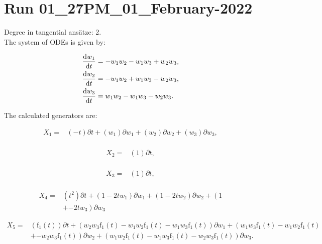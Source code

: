 \section*{Run 01\_27PM\_01\_February-2022}
Degree in tangential ansätze:	2.\\
The system of ODEs is given by:

\begin{align*}
\dv{w_{1}}{t}&=- w_{1} w_{2} - w_{1} w_{3} + w_{2} w_{3},\\
\dv{w_{2}}{t}&=- w_{1} w_{2} + w_{1} w_{3} - w_{2} w_{3},\\
\dv{w_{3}}{t}&=w_{1} w_{2} - w_{1} w_{3} - w_{2} w_{3}.\\
\end{align*}

\noindent The calculated generators are:

\begin{align*}
X_{1}=&\left(- t \right)\partial t+\left(w_{1} \right)\partial w_{1}+\left(w_{2} \right)\partial w_{2}+\left(w_{3} \right)\partial w_{3},\\
\end{align*}

\begin{align*}
X_{2}=&\left(1 \right)\partial t,\\
\end{align*}

\begin{align*}
X_{3}=&\left(1 \right)\partial t,\\
\end{align*}

\begin{align*}
X_{4}=&\left(t^{2} \right)\partial t+\left(1- 2 t w_{1} \right)\partial w_{1}+\left(1- 2 t w_{2} \right)\partial w_{2}+\left(1\right.\\
&+\left.- 2 t w_{3} \right)\partial w_{3}
\end{align*}

\begin{align*}
X_{5}=&\left(\operatorname{f_{1}}{\left(t \right)} \right)\partial t+\left(w_{2} w_{3} \operatorname{f_{1}}{\left(t \right)}- w_{1} w_{2} \operatorname{f_{1}}{\left(t \right)}- w_{1} w_{3} \operatorname{f_{1}}{\left(t \right)} \right)\partial w_{1}+\left(w_{1} w_{3} \operatorname{f_{1}}{\left(t \right)}- w_{1} w_{2} \operatorname{f_{1}}{\left(t \right)}\right.\\
&+\left.- w_{2} w_{3} \operatorname{f_{1}}{\left(t \right)} \right)\partial w_{2}+\left(w_{1} w_{2} \operatorname{f_{1}}{\left(t \right)} - w_{1} w_{3} \operatorname{f_{1}}{\left(t \right)} - w_{2} w_{3} \operatorname{f_{1}}{\left(t \right)} \right)\partial w_{3}.\\
\end{align*}



